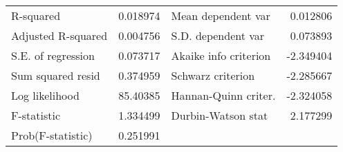 \begin{tabular}{lrrrr}
\midrule
\multicolumn{1}{l}{R-squared}&\multicolumn{1}{r}{0.018974}&\multicolumn{2}{l}{Mean dependent var}&\multicolumn{1}{r}{0.012806}\\
\multicolumn{1}{l}{Adjusted R-squared}&\multicolumn{1}{r}{0.004756}&\multicolumn{2}{l}{S.D. dependent var}&\multicolumn{1}{r}{0.073893}\\
\multicolumn{1}{l}{S.E. of regression}&\multicolumn{1}{r}{0.073717}&\multicolumn{2}{l}{Akaike info criterion}&\multicolumn{1}{r}{-2.349404}\\
\multicolumn{1}{l}{Sum squared resid}&\multicolumn{1}{r}{0.374959}&\multicolumn{2}{l}{Schwarz criterion}&\multicolumn{1}{r}{-2.285667}\\
\multicolumn{1}{l}{Log likelihood}&\multicolumn{1}{r}{85.40385}&\multicolumn{2}{l}{Hannan-Quinn criter.}&\multicolumn{1}{r}{-2.324058}\\
\multicolumn{1}{l}{F-statistic}&\multicolumn{1}{r}{1.334499}&\multicolumn{2}{l}{Durbin-Watson stat}&\multicolumn{1}{r}{2.177299}\\
\multicolumn{1}{l}{Prob(F-statistic)}&\multicolumn{1}{r}{0.251991}&\multicolumn{1}{c}{}&\multicolumn{1}{c}{}&\multicolumn{1}{c}{}\\
\bottomrule
\end{tabular}